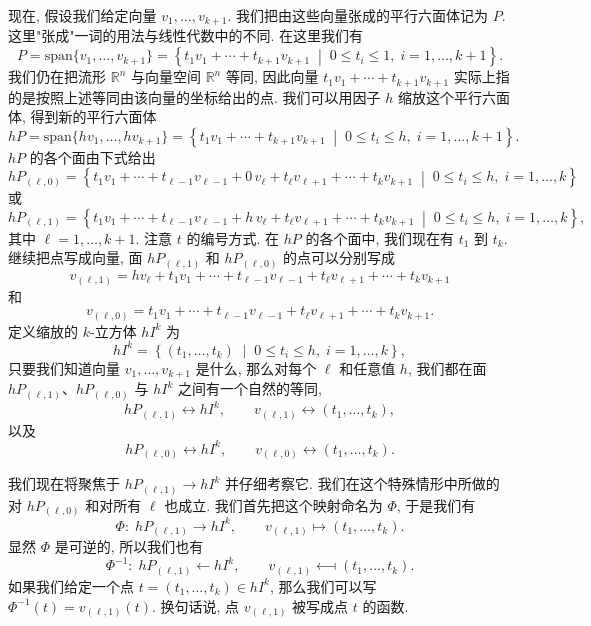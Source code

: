 现在, 假设我们给定向量 $v_1,\ldots,v_{k+1}$. 我们把由这些向量张成的平行六面体记为 $P$. 这里"张成"一词的用法与线性代数中的不同. 在这里我们有
\[
P=\mathrm{span}\{v_1,\ldots,v_{k+1}\}
=\left\{t_1v_1+\cdots+t_{k+1}v_{k+1}\;\middle|\;0\leq t_i\leq 1,\;i=1,\ldots,k+1\right\}.
\]
我们仍在把流形 $\mathbb{R}^n$ 与向量空间 $\mathbb{R}^n$ 等同, 因此向量 $t_1v_1+\cdots+t_{k+1}v_{k+1}$ 实际上指的是按照上述等同由该向量的坐标给出的点. 我们可以用因子 $h$ 缩放这个平行六面体, 得到新的平行六面体
\[
hP=\mathrm{span}\{hv_1,\ldots,hv_{k+1}\}
=\left\{t_1v_1+\cdots+t_{k+1}v_{k+1}\;\middle|\;0\leq t_i\leq h,\;i=1,\ldots,k+1\right\}.
\]
$hP$ 的各个面由下式给出
\[
hP_{(\ell,0)}=\left\{t_1v_1+\cdots+t_{\ell-1}v_{\ell-1}+0\,v_\ell+t_\ell v_{\ell+1}+\cdots+t_k v_{k+1}
\;\middle|\;0\leq t_i\leq h,\;i=1,\ldots,k\right\}
\]
或
\[
hP_{(\ell,1)}=\left\{t_1v_1+\cdots+t_{\ell-1}v_{\ell-1}+h\,v_\ell+t_\ell v_{\ell+1}+\cdots+t_k v_{k+1}
\;\middle|\;0\leq t_i\leq h,\;i=1,\ldots,k\right\},
\]
其中 $\ell=1,\ldots,k+1$. 注意 $t$ 的编号方式. 在 $hP$ 的各个面中, 我们现在有 $t_1$ 到 $t_k$. 继续把点写成向量, 面 $hP_{(\ell,1)}$ 和 $hP_{(\ell,0)}$ 的点可以分别写成
\[
v_{(\ell,1)}=hv_\ell+t_1v_1+\cdots+t_{\ell-1}v_{\ell-1}+t_\ell v_{\ell+1}+\cdots+t_k v_{k+1}
\]
和
\[
v_{(\ell,0)}=t_1v_1+\cdots+t_{\ell-1}v_{\ell-1}+t_\ell v_{\ell+1}+\cdots+t_k v_{k+1}.
\]
定义缩放的 $k$-立方体 $hI^k$ 为
\[
hI^k=\left\{(t_1,\ldots,t_k)\;\middle|\;0\leq t_i\leq h,\;i=1,\ldots,k\right\},
\]
只要我们知道向量 $v_1,\ldots,v_{k+1}$ 是什么, 那么对每个 $\ell$ 和任意值 $h$, 我们都在面 $hP_{(\ell,1)}$、$hP_{(\ell,0)}$ 与 $hI^k$ 之间有一个自然的等同, 
\[
hP_{(\ell,1)}\longleftrightarrow hI^k,\qquad v_{(\ell,1)}\longleftrightarrow (t_1,\ldots,t_k),
\]
以及
\[
hP_{(\ell,0)}\longleftrightarrow hI^k,\qquad v_{(\ell,0)}\longleftrightarrow (t_1,\ldots,t_k).
\]

我们现在将聚焦于 $hP_{(\ell,1)}\to hI^k$ 并仔细考察它. 我们在这个特殊情形中所做的对 $hP_{(\ell,0)}$ 和对所有 $\ell$ 也成立. 我们首先把这个映射命名为 $\Phi$, 于是我们有
\[
\Phi:\;hP_{(\ell,1)}\longrightarrow hI^k,\qquad v_{(\ell,1)}\longmapsto (t_1,\ldots,t_k).
\]
显然 $\Phi$ 是可逆的, 所以我们也有
\[
\Phi^{-1}:\;hP_{(\ell,1)}\longleftarrow hI^k,\qquad v_{(\ell,1)}\longmapsfrom (t_1,\ldots,t_k).
\]
如果我们给定一个点 $t=(t_1,\ldots,t_k)\in hI^k$, 那么我们可以写 $\Phi^{-1}(t)=v_{(\ell,1)}(t)$. 换句话说, 点 $v_{(\ell,1)}$ 被写成点 $t$ 的函数.

